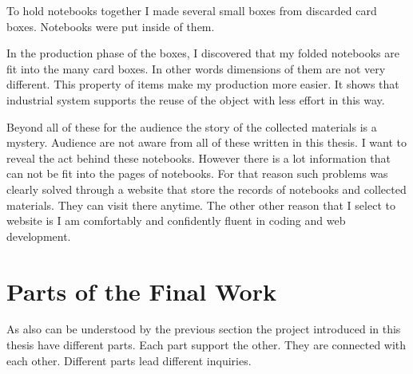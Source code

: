 To hold notebooks together I made several small boxes from discarded card boxes. Notebooks were put inside of them.

In the production phase of the boxes, I discovered that my folded notebooks are fit into the many card boxes. In other words dimensions of them are not very different. This property of items make my production more easier. It shows that industrial system supports the reuse of the object with less effort in this way.









Beyond all of these for the audience the story of the collected materials is a mystery. Audience are not aware from all of these written in this thesis. I want to reveal the act behind these notebooks. However there is a lot information that can not be fit into the pages of notebooks. For that reason such problems was clearly solved through a website that store the records of notebooks and collected materials. They can visit there anytime. The other other reason that I select to website is I am comfortably and confidently fluent in coding and web development.





%
%
\section{Parts of the Final Work}
As also can be understood by the previous section the project introduced in this thesis have different parts. Each part support the other. They are connected with each other. Different parts lead different inquiries.





